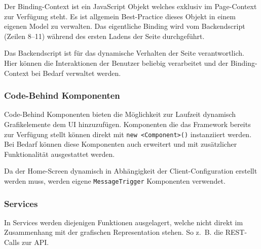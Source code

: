 

Der Binding-Context ist ein JavaScript Objekt welches exklusiv im Page-Context zur Verfügung steht.
Es ist allgemein Best-Practice dieses Objekt in einem eigenen Model zu verwalten.
Das eigentliche Binding wird vom Backendscript~\emph{} (Zeilen 8--11) während des ersten Ladens der Seite durchgeführt.



Das Backendscript ist für das dynamische Verhalten der Seite verantwortlich.
Hier können die Interaktionen der Benutzer beliebig verarbeitet und der Binding-Context bei Bedarf verwaltet werden.



\subsubsection*{Code-Behind Komponenten}\label{subsubsec:code-behind-komponenten}
Code-Behind Komponenten bieten die Möglichkeit zur Laufzeit dynamisch Grafikelemente dem UI hinzuzufügen.
Komponenten die das Framework bereits zur Verfügung stellt können direkt mit \texttt{new \textless Component\textgreater()} instanziiert werden.
Bei Bedarf können diese Komponenten auch erweitert und mit zusätzlicher Funktionalität ausgestattet werden.

Da der Home-Screen dynamisch in Abhängigkeit der Client-Configuration erstellt werden muss, werden eigene \texttt{MessageTrigger} Komponenten verwendet.
\subsubsection*{Services}\label{subsubsec:services}
In Services werden diejenigen Funktionen ausgelagert, welche nicht direkt im Zusammenhang mit der grafischen Representation stehen.
So z.~B. die REST-Calls zur API.

\clearpage

